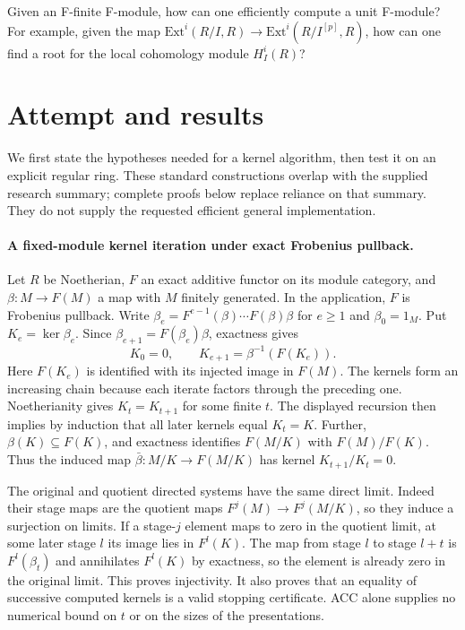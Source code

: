 \documentclass[11pt]{article}
\begin{document}
Given an F-finite F-module, how can one efficiently compute a unit F-module? For example, given the map $\mathrm{Ext}^i(R/I,R)\to \mathrm{Ext}^i(R/I^{[p]},R)$, how can one find a root for the local cohomology module $H^i_I(R)$?

\section{Attempt and results}
We first state the hypotheses needed for a kernel algorithm, then test it on
an explicit regular ring. These standard constructions overlap with the
supplied research summary; complete proofs below replace reliance on that
summary. They do not supply the requested efficient general implementation.

\paragraph{A fixed-module kernel iteration under exact Frobenius pullback.}
Let $R$ be Noetherian, $F$ an exact additive functor on its module category,
and $\beta:M\to F(M)$ a map with $M$ finitely generated. In the application,
$F$ is Frobenius pullback. Write
$\beta_e=F^{e-1}(\beta)\cdots F(\beta)\beta$ for $e\ge1$ and
$\beta_0=1_M$. Put $K_e=\ker\beta_e$. Since
$\beta_{e+1}=F(\beta_e)\beta$, exactness gives
\[
K_0=0,\qquad K_{e+1}=\beta^{-1}(F(K_e)).
\]
Here $F(K_e)$ is identified with its injected image in $F(M)$.
The kernels form an increasing chain because each iterate factors through
the preceding one. Noetherianity gives $K_t=K_{t+1}$ for some finite $t$.
The displayed recursion then implies by induction that all later kernels
equal $K_t=K$. Further, $\beta(K)\subseteq F(K)$, and exactness identifies
$F(M/K)$ with $F(M)/F(K)$. Thus the induced map
$\bar\beta:M/K\to F(M/K)$ has kernel $K_{t+1}/K_t=0$.

The original and quotient directed systems have the same direct limit.
Indeed their stage maps are the quotient maps $F^j(M)\to F^j(M/K)$, so they
induce a surjection on limits. If a stage-$j$ element maps to zero in the
quotient limit, at some later stage $l$ its image lies in $F^l(K)$.
The map from stage $l$ to stage $l+t$ is $F^l(\beta_t)$ and annihilates
$F^l(K)$ by exactness, so the element is already zero in the original limit.
This proves injectivity. It also proves that an equality of successive
computed kernels is a valid stopping certificate. ACC alone supplies no
numerical bound on $t$ or on the sizes of the presentations.
\end{document}
